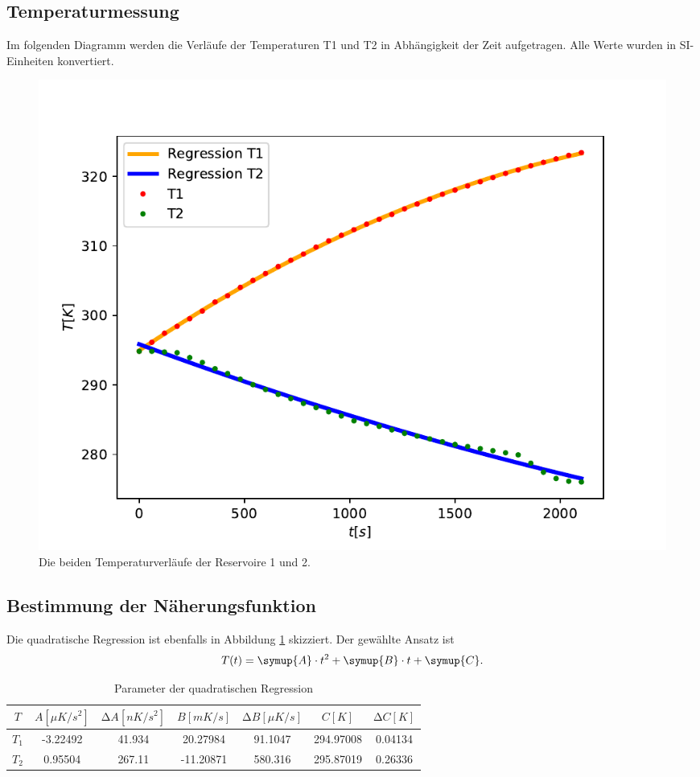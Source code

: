 \subsection{Temperaturmessung}
Im folgenden Diagramm werden die Verläufe der Temperaturen T1 und T2 in Abhängigkeit der Zeit aufgetragen.
Alle Werte wurden in SI-Einheiten konvertiert.
\begin{figure}
  \centering
  \includegraphics[scale = 0.75]{Temperaturverlaeufe.pdf}
  \caption{Die beiden Temperaturverläufe der Reservoire 1 und 2.}
  \label{fig:TemperaturverlaufA}
\end{figure}

\subsection{Bestimmung der Näherungsfunktion}
Die quadratische Regression ist ebenfalls in Abbildung \ref{fig:TemperaturverlaufA} skizziert. Der gewählte Ansatz ist
\begin{equation}
  T(t) = \symup{A} \cdot t^2 + \symup{B} \cdot t + \symup{C}.
  \label{eq:Regressionsgleichung}
\end{equation}
\begin{table}
  \centering
  \caption{Parameter der quadratischen Regression}
  \label{tab:regression1}
  \begin{tabular}{c S S S S S S}
    \toprule
     {$T$} & {$A [\mu K/s^2]$} & {$\increment A [nK/s^2]$} & {$B [mK/s]$} & {$\increment B [\mu K/s]$} & {$C [K]$} & {$\increment C [K]$} \\
    \midrule
    {$T_\text{1}$} & -3.22492 &  41.934 &  20.27984 & 91.1047 & 294.97008 & 0.04134 \\
    {$T_\text{2}$} & 0.95504 &  267.11 & -11.20871 & 580.316 & 295.87019 & 0.26336 \\
    \bottomrule
  \end{tabular}
\end{table}


